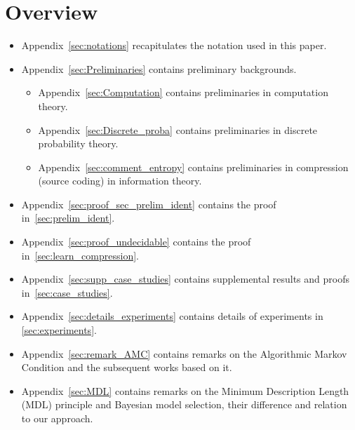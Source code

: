 \section*{Overview}
\begin{itemize}
    \item Appendix~\cref{sec:notations} recapitulates the notation used in this paper.
    \item Appendix~\cref{sec:Preliminaries} contains preliminary backgrounds.
    \begin{itemize}
        \item Appendix~\cref{sec:Computation} contains preliminaries in computation theory.
        \item Appendix~\cref{sec:Discrete_proba} contains preliminaries in discrete probability theory.
        \item Appendix~\cref{sec:comment_entropy} contains preliminaries in compression (source coding) in information theory.
    \end{itemize}
    \item Appendix~\cref{sec:proof_sec_prelim_ident} contains the proof in~\cref{sec:prelim_ident}.

    \item Appendix~\cref{sec:proof_undecidable} contains the proof in~\cref{sec:learn_compression}.
%
%
%
%
%
%
    \item Appendix~\cref{sec:supp_case_studies} contains supplemental results and proofs in~\cref{sec:case_studies}.
    \item Appendix~\cref{sec:details_experiments} contains details of experiments in \cref{sec:experiments}.
    \item Appendix~\cref{sec:remark_AMC} contains remarks on the Algorithmic Markov Condition \citep{janzing2010causal} and the subsequent works based on it.
    \item Appendix~\cref{sec:MDL} contains remarks on the Minimum Description Length (MDL) principle and Bayesian model selection, their difference and relation to our approach.
\end{itemize}
